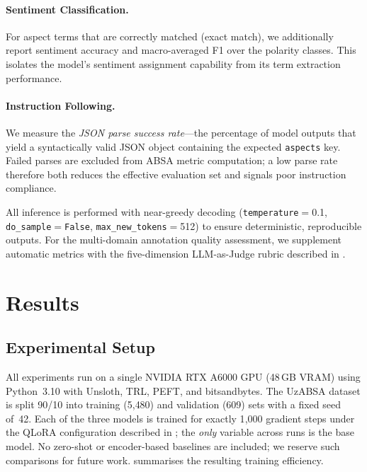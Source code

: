 \documentclass[runningheads]{llncs}
\begin{document}
\paragraph{Sentiment Classification.} For aspect terms that are correctly matched (exact match), we additionally report sentiment accuracy and macro-averaged F1 over the polarity classes. This isolates the model's sentiment assignment capability from its term extraction performance.

\paragraph{Instruction Following.} We measure the \emph{JSON parse success rate}---the percentage of model outputs that yield a syntactically valid JSON object containing the expected \texttt{aspects} key. Failed parses are excluded from ABSA metric computation; a low parse rate therefore both reduces the effective evaluation set and signals poor instruction compliance.

All inference is performed with near-greedy decoding (\texttt{temperature}$=$0.1, \texttt{do\_sample}$=$\texttt{False}, \texttt{max\_new\_tokens}$=$512) to ensure deterministic, reproducible outputs. For the multi-domain annotation quality assessment, we supplement automatic metrics with the five-dimension LLM-as-Judge rubric described in .


\section{Results}
\label{sec:results}

\subsection{Experimental Setup}
\label{sec:setup}

All experiments run on a single NVIDIA RTX A6000 GPU (48\,GB VRAM) using Python~3.10 with Unsloth, TRL, PEFT, and bitsandbytes. The UzABSA dataset is split 90/10 into training (5{,}480) and validation (609) sets with a fixed seed of~42. Each of the three models is trained for exactly 1{,}000 gradient steps under the QLoRA configuration described in ; the \emph{only} variable across runs is the base model. No zero-shot or encoder-based baselines are included; we reserve such comparisons for future work.  summarises the resulting training efficiency.
\end{document}
